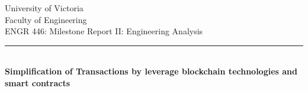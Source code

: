 \documentclass[12pt]{scrreprt}
\begin{document}
\begin{titlepage}
	\begin{center}
		{\vspace*{3pt} }
		{\Large University of Victoria \\ \vspace{4pt}}
		{\Large Faculty of Engineering \\ \vspace{4pt}}
		{\Large ENGR 446: Milestone Report II: Engineering Analysis \\ \vspace{4pt}}  
		\rule[13pt]{1\textwidth}{1pt} \\ \vspace{1pt}
		{\LARGE \textbf{{Simplification of Transactions by leverage blockchain technologies and smart contracts}} \\ \vspace{15 pt}}
		

\end{center}
\end{titlepage}
\end{document}
